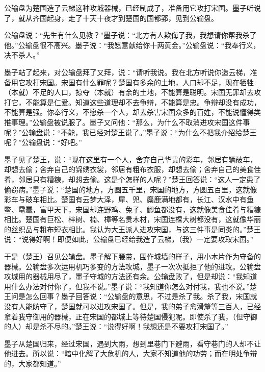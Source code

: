 \documentclass[12pt,UTF-8,openany,a4]{ctexbook}
\begin{document}
\vspace{1em}

\begin{large}\yiwen
    
    公输盘为楚国造了云梯这种攻城器械，已经制成了，准备用它攻打宋国。墨子听说了，就从齐国起身，走了十天十夜才到楚国的国都郢，见到公输盘。
    
    公输盘说：“先生有什么见教？”墨子说：“北方有人欺侮了我，我想请你帮我杀了他。”公输盘很不高兴。墨子说：“我愿意献给你十两黄金。”公输盘说：“我奉行义，决不杀人。”
    
    墨子站了起来，对公输盘拜了又拜，说：“请听我说。我在北方听说你造云梯，准备用它攻打宋国。宋国有什么罪呢？楚国有多余的土地，人口却不足，现在牺牲（本就）不足的人口，掠夺（本就）有余的土地，不能算是聪明。宋国无罪却去攻打它，不能算是仁爱。知道这些道理却不去争辩，不能算是忠。争辩却没有成功，不能算是强。你奉行义，不愿杀一个人，却去杀害宋国众多的百姓，不能说懂得类推事理。”公输盘被说服了。墨子又问他：“那么，为什么不取消进攻宋国这件事呢？”公输盘说：“不能，我已经对楚王说了。”墨子说：“为什么不把我介绍给楚王呢？”公输盘说：“好吧。”
    
    墨子见了楚王，说：“现在这里有一个人，舍弃自己华贵的彩车，邻居有辆破车，却想去偷；舍弃自己的锦绣衣裳，邻居有粗布衣服，却想去偷；舍弃自己的美食佳肴，邻居只有糟糠，却想去偷。这是个怎样的人呢？”楚王回答说：“这人一定患了偷窃病。”墨子说：“楚国的地方，方圆五千里，宋国的地方，方圆五百里，这就像彩车与破车相比。楚国有云梦大泽，犀、兕、麋鹿满地都有，长江、汉水中有鱼鳖、鼋鼍，富甲天下，宋国却连野鸡、兔子、鲫鱼都没有，这就像美食佳肴与糟糠相比。楚国有巨松、梓树、楠、樟等名贵木材，宋国连棵大树都没有，这就像华丽的丝织品与粗布短衣相比。我认为大王派人进攻宋国，与这三件事是同类的。”楚王说：“说得好啊！即便如此，公输盘已经给我造了云梯，（我）一定要攻取宋国。”
    
    于是（楚王）召见公输盘。墨子解下腰带，围作城墙的样子，用小木片作为守备的器械。公输盘多次运用机巧多变的方法攻城，墨子一次次抵拒了他的进攻。公输盘攻城用的器械用尽了，墨子守城的方法还有余。公输盘败了，但是却说：“我知道用什么办法对付你了，但我不说。”墨子说：“我知道你怎么对付我，我也不说。”楚王问是怎么回事？墨子回答说：“公输盘的意思，不过是杀了我。杀了我，宋国就没有人能防守了，楚国就可以进攻宋国了。但是，我的弟子禽滑釐等三百人，已经拿着我守御用的器械，正在宋国的都城上等待楚国侵犯呢。即使杀了我，（但守御的人）却是杀不尽的。”楚王说：“说得好啊！我想还是不要攻打宋国了。”
    
    墨子从楚国归来，经过宋国，遇到大雨，想到里巷门下避雨，看守巷门的人却不让他进去。所以说：“暗中化解了大危机的人，大家不知道他的功劳；而在明处争辩的，大家都知道。”
    

\end{large}
\end{document}

